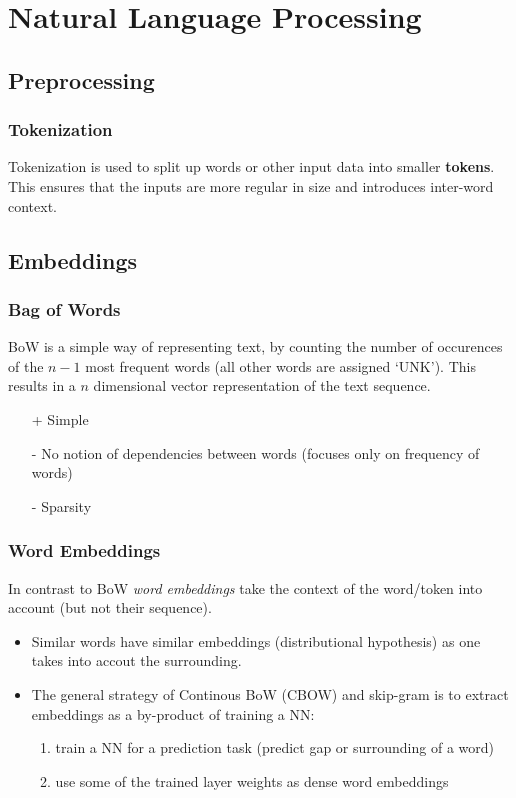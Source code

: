 \section{Natural Language Processing}
\subsection{Preprocessing}
\subsubsection{Tokenization}
Tokenization is used to split up words or other input data into smaller \textbf{tokens}. This ensures that the inputs are more regular in size and introduces inter-word context.

\subsection{Embeddings}

\subsubsection{Bag of Words}
BoW is a simple way of representing text, by counting the number of occurences of the $n-1$ most frequent words (all other words are assigned `UNK').
This results in a $n$ dimensional vector representation of the text sequence.
\begin{itemize}
    \item [+] Simple
    \item [-] No notion of dependencies between words (focuses only on frequency of words)
    \item [-] Sparsity 
\end{itemize}
\subsubsection{Word Embeddings}
In contrast to BoW \textit{word embeddings} take the context of the word/token into account (but not their sequence).
\begin{itemize}
    \item Similar words have similar embeddings (distributional hypothesis) as one takes into accout the surrounding.
    \item The general strategy of Continous BoW (CBOW) and skip-gram is to extract embeddings as a by-product of training a NN:
    \begin{enumerate}
        \item train a NN for a prediction task (predict gap or surrounding of a word)
        \item use some of the trained layer weights as dense word embeddings
    \end{enumerate}
\end{itemize}

